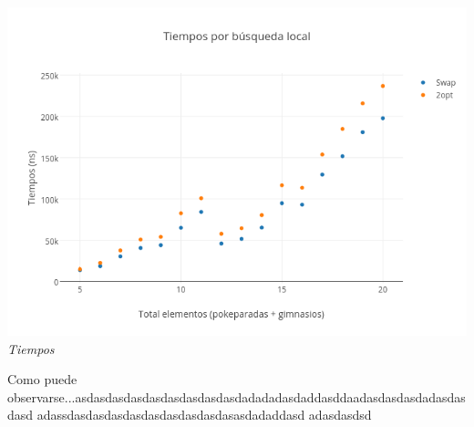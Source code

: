    \vspace*{0.3cm} \vspace*{0.3cm}
  \begin{center}
	\includegraphics[scale=0.40]{./EJ3/tiemposLocales20.png}
	\label{fig:randomTiempos1}	
	\\{\textit{Tiempos}}
  \end{center}
  \vspace*{0.3cm} 

Como puede observarse...asdasdasdasdasdasdasdasdasdadadadasdaddasddaadasdasdasdadasdasdasd
adassdasdasdasdasdasdasdasdasdasasdadaddasd
adasdasdsd
\\\\
\begin{figure}[h] 
 \centering
       \label{fig:randomDist2}
    \label{fig:randomMejora2}
    \end{figure}
 
